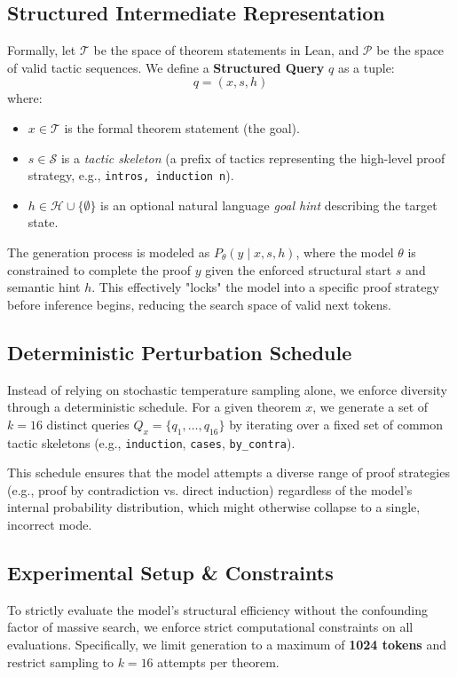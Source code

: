 \documentclass{article}
\begin{document}
\subsection{Structured Intermediate Representation}
Formally, let $\mathcal{T}$ be the space of theorem statements in Lean, and $\mathcal{P}$ be the space of valid tactic sequences. We define a \textbf{Structured Query} $q$ as a tuple:
\begin{equation}
    q = (x, s, h)
\end{equation}
where:
\begin{itemize}
    \item $x \in \mathcal{T}$ is the formal theorem statement (the goal).
    \item $s \in \mathcal{S}$ is a \textit{tactic skeleton} (a prefix of tactics representing the high-level proof strategy, e.g., \texttt{intros, induction n}).
    \item $h \in \mathcal{H} \cup \{\emptyset\}$ is an optional natural language \textit{goal hint} describing the target state.
\end{itemize}

The generation process is modeled as $P_{\theta}(y \mid x, s, h)$, where the model $\theta$ is constrained to complete the proof $y$ given the enforced structural start $s$ and semantic hint $h$. This effectively "locks" the model into a specific proof strategy before inference begins, reducing the search space of valid next tokens.

\subsection{Deterministic Perturbation Schedule}
Instead of relying on stochastic temperature sampling alone, we enforce diversity through a deterministic schedule. For a given theorem $x$, we generate a set of $k=16$ distinct queries $Q_x = \{q_1, \dots, q_{16}\}$ by iterating over a fixed set of common tactic skeletons (e.g., \texttt{induction}, \texttt{cases}, \texttt{by\_contra}).

This schedule ensures that the model attempts a diverse range of proof strategies (e.g., proof by contradiction vs. direct induction) regardless of the model's internal probability distribution, which might otherwise collapse to a single, incorrect mode.

\subsection{Experimental Setup \& Constraints}
\label{sec:constraints}
To strictly evaluate the model's structural efficiency without the confounding factor of massive search, we enforce strict computational constraints on all evaluations. Specifically, we limit generation to a maximum of \textbf{1024 tokens} and restrict sampling to $k=16$ attempts per theorem.
\end{document}

